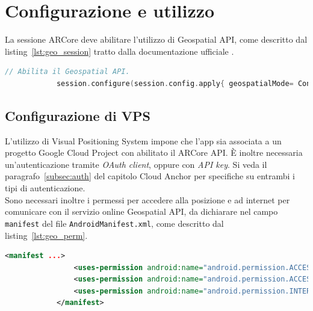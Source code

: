\documentclass[crop=false, class=book]{standalone}
\begin{document}
	\section{Configurazione e utilizzo}
	La sessione ARCore deve abilitare l'utilizzo di Geospatial API, come descritto dal listing~\vref{lst:geo_session} tratto dalla documentazione ufficiale \cite{google2022geospatial}.
	
	\begin{center}
		\begin{minipage}{0.95\textwidth}
			\begin{lstlisting}[caption={Configurazione della modalità Geospatial API.}, label={lst:geo_session}, language=Kotlin]
			// Abilita il Geospatial API.
			session.configure(session.config.apply{ geospatialMode= Config.GeospatialMode.ENABLED})
			\end{lstlisting}
		\end{minipage}
	\end{center}
	
	\subsection{Configurazione di VPS}
	L'utilizzo di Visual Positioning System impone che l'app sia associata a un progetto Google Cloud Project con abilitato il ARCore API. \`E inoltre necessaria un'autenticazione tramite \textit{OAuth client}, oppure con \textit{API key}. Si veda il paragrafo~\vref{subsec:auth} del capitolo Cloud Anchor per specifiche su entrambi i tipi di autenticazione.
	\\
	Sono necessari inoltre i permessi per accedere alla posizione e ad internet per comunicare con il servizio online Geospatial API, da dichiarare nel campo \verb|manifest| del file \verb|AndroidManifest.xml|, come descritto dal listing~\vref{lst:geo_perm}.
	
	\begin{center}
		\begin{minipage}{0.95\textwidth}
			\begin{lstlisting}[caption={Richiesta di permessi per l'uso di Geospatial API.}, label={lst:geo_perm}, language=xml, morekeywords={android:name, android:value}, keywordstyle={\color{NavyBlue}\bfseries}, alsodigit={-}, stringstyle={\color{ForestGreen}\ttfamily}, emph={manifest, uses-permission},emphstyle={\color{OrangeRed}}]
			<manifest ...>
				<uses-permission android:name="android.permission.ACCESS_FINE_LOCATION"/>
				<uses-permission android:name="android.permission.ACCESS_COARSE_LOCATION"/>
				<uses-permission android:name="android.permission.INTERNET"/>
			</manifest>
			\end{lstlisting}
		\end{minipage}
	\end{center}
\end{document}
